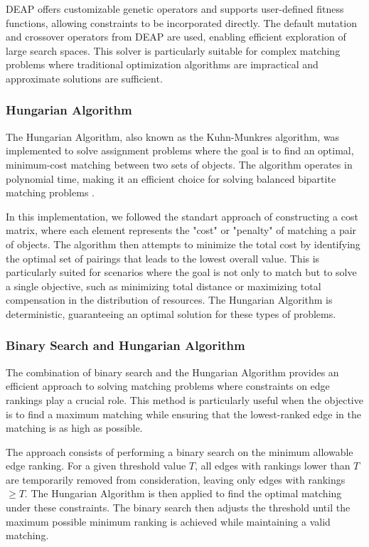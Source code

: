         DEAP offers customizable genetic operators and supports user-defined fitness functions, allowing constraints to be incorporated directly. The default mutation and crossover operators from DEAP are used, enabling efficient exploration of large search spaces. This solver is particularly suitable for complex matching problems where traditional optimization algorithms are impractical and approximate solutions are sufficient.
    \subsubsection{Hungarian Algorithm}
    The Hungarian Algorithm, also known as the Kuhn-Munkres algorithm, was implemented to solve assignment problems where the goal is to find an optimal, minimum-cost matching between two sets of objects. The algorithm operates in polynomial time, making it an efficient choice for solving balanced bipartite matching problems \cite{kuhn1955hungarian}. 
    
    In this implementation, we followed the standart approach of constructing a cost matrix, where each element represents the "cost" or "penalty" of matching a pair of objects. The algorithm then attempts to minimize the total cost by identifying the optimal set of pairings that leads to the lowest overall value. This is particularly suited for scenarios where the goal is not only to match but to solve a single objective, such as minimizing total distance or maximizing total compensation in the distribution of resources. The Hungarian Algorithm is deterministic, guaranteeing an optimal solution for these types of problems.

    \subsubsection{Binary Search and Hungarian Algorithm}

        The combination of binary search and the Hungarian Algorithm provides an efficient approach to solving matching problems where constraints on edge rankings play a crucial role. This method is particularly useful when the objective is to find a maximum matching while ensuring that the lowest-ranked edge in the matching is as high as possible.
        
        The approach consists of performing a binary search on the minimum allowable edge ranking. For a given threshold value \( T \), all edges with rankings lower than \( T \) are temporarily removed from consideration, leaving only edges with rankings \(\geq T\). The Hungarian Algorithm is then applied to find the optimal matching under these constraints. The binary search then adjusts the threshold until the maximum possible minimum ranking is achieved while maintaining a valid matching.
        
